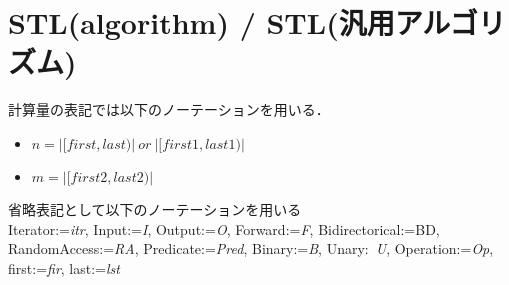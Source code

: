 \section{STL(algorithm) / STL(汎用アルゴリズム)}
計算量の表記では以下のノーテーションを用いる．
\begin{itemize}
	\item $n = |[first,last)|~or~|[first1,last1)|$
	\item $m = |[first2,last2)|$
\end{itemize}

省略表記として以下のノーテーションを用いる\\
Iterator:=\textit{itr}, Input:=\textit{I}, Output:=\textit{O}, Forward:=\textit{F},
Bidirectorical:={BD}, RandomAccess:=\textit{RA}, Predicate:=\textit{Pred}, Binary:=\textit{B},
Unary:~\textit{U}, Operation:=\textit{Op}, first:=\textit{fir}, last:=\textit{lst}

